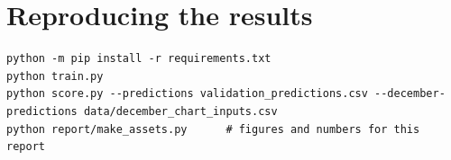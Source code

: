 \documentclass[10pt,a4paper]{article}
\begin{document}
\section*{Reproducing the results}
\begin{codebox}
\begin{lstlisting}[style=py,language={},basicstyle=\ttfamily\scriptsize\color{ink}]
python -m pip install -r requirements.txt
python train.py
python score.py --predictions validation_predictions.csv --december-predictions data/december_chart_inputs.csv
python report/make_assets.py      # figures and numbers for this report
\end{lstlisting}
\end{codebox}
\end{document}
